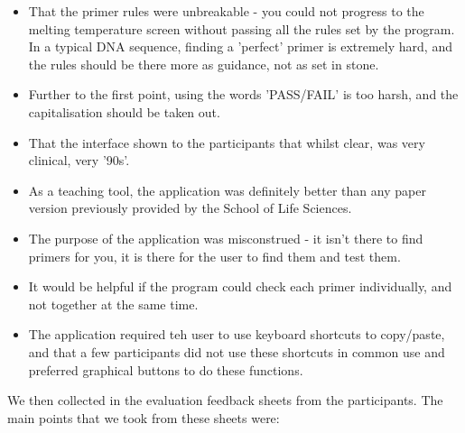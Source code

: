 \begin{itemize}

\item That the primer rules were unbreakable - you could not progress to the melting temperature screen without passing all the rules set by the program. In a typical DNA sequence, finding a 'perfect' primer is extremely hard, and the rules should be there more as guidance, not as set in stone.
\item Further to the first point, using the words 'PASS/FAIL' is too harsh, and the capitalisation should be taken out.
\item That the interface shown to the participants that whilst clear, was very clinical, very '90s'.
\item As a teaching tool, the application was definitely better than any paper version previously provided by the School of Life Sciences.
\item The purpose of the application was misconstrued - it isn't there to find primers for you, it is there for the user to find them and test them.
\item It would be helpful if the program could check each primer individually, and not together at the same time.
\item The application required teh user to use keyboard shortcuts to copy/paste, and that a few participants did not use these shortcuts in common use and preferred graphical buttons to do these functions.
\end{itemize}

We then collected in the evaluation feedback sheets from the participants. The main points that we took from these sheets were:

